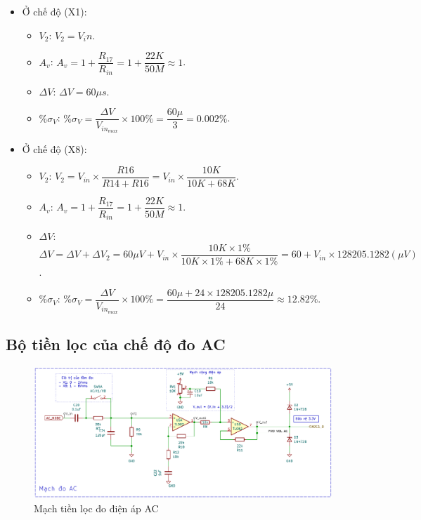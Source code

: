 \begin{itemize}[label = -]
	\item Ở chế độ (X1): 
		\begin{itemize}[label = +]
			\item $V_2$: $V_2 = V_in$.
			\item $A_{v}$: $ A_{v} = 1 + \dfrac{R_{17}}{R_{in}} = 1 + \dfrac{22K}{50M} \approx 1$.
			\item $\Delta V$: $\Delta V = 60 \mu s$.
			\item $\%\sigma_{V}$: $\%\sigma_{V} = \dfrac{\Delta V}{V_{in_{max}}}\times 100\% = \dfrac{60\mu }{3} = 0.002\%$.
		\end{itemize}
	\item Ở chế độ (X8):
		\begin{itemize}[label = +]
			\item $V_2$: $V_2 =  V_{in} \times \dfrac{R16}{R14 + R16} = V_{in} \times \dfrac{10K}{10K + 68K}$.
			\item $A_{v}$: $ A_{v} = 1 + \dfrac{R_{17}}{R_{in}} = 1 + \dfrac{22K}{50M} \approx 1$.
			\item $\Delta V$: $\Delta V = \Delta V + \Delta V_2 = 60\mu V + V_{in} \times\dfrac{10K\times 1\%}{10K\times 1\% + 68K\times 1\%} = 60 + V_{in} \times 128205.1282 (\mu V)$.
			\item $\%\sigma_{V}$: $\%\sigma_{V} = \dfrac{\Delta V}{V_{in_{max}}}\times 100\% = \dfrac{60\mu + 24\times128205.1282\mu}{24} \approx 12.82\%$.
		\end{itemize}
\end{itemize}

\subsection{Bộ tiền lọc của chế độ đo AC}

\begin{figure}[H]
	\centering
	\includegraphics[width=0.6\linewidth]{./picture/board_AC.pdf}
	\caption{Mạch tiền lọc đo điện áp AC}
	\label{f_board_Ac}
\end{figure}

